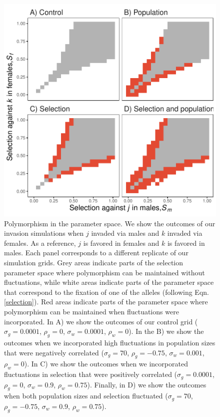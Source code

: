 \documentclass[12pt]{article}
\begin{document}
\begin{figure}[H]
  \centerline{\includegraphics[]{outcomes.pdf}}
  \caption{  Polymorphism in the parameter space. We show the outcomes of our invasion simulations  when $j$ invaded via males and $k$ invaded via females. As a reference, $j$ is favored in females and $k$ is favored in males. Each panel corresponds to a different replicate of our simulation grids. Grey areas indicate parts of the selection parameter space where polymorphism can be maintained without fluctuations, while white areas indicate parts of the parameter space that correspond to the fixation of one of the alleles (following Eqn.\ref{selection}). Red areas indicate parts of the parameter space where polymorphism can be maintained when fluctuations were incorporated. In A) we show the outcomes of our control grid ($\sigma_{g}=0.0001$, $\rho_{g}=0$, $\sigma_{w}=0.0001$, $\rho_{w}=0$). In the B) we show the outcomes when we incorporated high fluctuations in population sizes that were negatively correlated ($\sigma_{g}=70$, $\rho_{g}=-0.75$, $\sigma_{w}=0.001$, $\rho_{w}=0$). In C) we show the outcomes when we incorporated fluctuations in selection that were positively correlated  ($\sigma_{g}=0.0001$, $\rho_{g}=0$, $\sigma_{w}=0.9$, $\rho_{w}=0.75$). Finally, in D) we show the outcomes when both population sizes and selection fluctuated ($\sigma_{g}=70$, $\rho_{g}=-0.75$, $\sigma_{w}=0.9$, $\rho_{w}=0.75$). }
    \label{fig:outcomes}
\end{figure}
\end{document}
